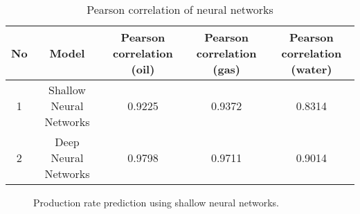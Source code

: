 \documentclass[english]{article}
\makeatletter
\def\maxwidth{\ifdim\Gin@nat@width>\linewidth\linewidth
    \else\Gin@nat@width\fi}
\let\Oldincludegraphics\includegraphics
\renewcommand{\includegraphics}[1]{\Oldincludegraphics[width=.8\maxwidth]{#1}}
\makeatother
\begin{document}
\begin{table}[H]
\caption{Pearson correlation of neural networks}
\begin{tabular}{|c|c|c|c|c|}
\hline
\textbf{No} & \textbf{Model}          & \textbf{Pearson correlation (oil)} & \textbf{Pearson correlation (gas)} & \textbf{Pearson correlation (water)} \\ \hline
1           & Shallow Neural Networks & 0.9225                             & 0.9372                             & 0.8314                               \\ \hline
2           & Deep Neural Networks    & 0.9798                             & 0.9711                             & 0.9014                               \\ \hline
\end{tabular}
\end{table}
%
\begin{figure}[H]
     \begin{center}
%
    \end{center}
    \caption{%
        Production rate prediction using shallow neural networks.
     }%
   \label{fig:subfigures}
\end{figure}
\end{document}
